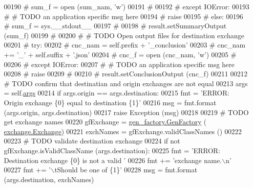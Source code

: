 \begin{DoxyCode}
{00190 \textcolor{comment}{#                sum\_f = open (sum\_nam, 'w')}
00191 \textcolor{comment}{#                }
00192 \textcolor{comment}{#            except IOError:}
00193 \textcolor{comment}{#                # TODO an application specific msg here}
00194 \textcolor{comment}{#                raise}
00195 \textcolor{comment}{#        else:}
00196 \textcolor{comment}{#            sum\_f = sys.\_\_stdout\_\_}
00197 \textcolor{comment}{#            }
00198 \textcolor{comment}{#        result.setSummaryOutput (sum\_f)}
00199 \textcolor{comment}{#            }
00200 \textcolor{comment}{#        # TODO Open output files for destination exchange}
00201 \textcolor{comment}{#        try:}
00202 \textcolor{comment}{#            cnc\_nam  =  self.prefix + '\_conclusion'}
00203 \textcolor{comment}{#            cnc\_nam += '\_' + self.suffix + '.json'}
00204 \textcolor{comment}{#            cnc\_f = open (cnc\_nam, 'w')}
00205 \textcolor{comment}{#            }
00206 \textcolor{comment}{#        except IOError:}
00207 \textcolor{comment}{#            # TODO an application specific msg here}
00208 \textcolor{comment}{#            raise}
00209 \textcolor{comment}{#            }
00210 \textcolor{comment}{#        result.setConclusionOutput (cnc\_f)}
00211             
00212         \textcolor{comment}{# TODO confirm that destinatian and origin exchanges are not equal}
00213         args = self.\hyperlink{classe2e_1_1_application_abade6fc2e2c04ddd7e48137a2a7721bd}{args} 
00214         \textcolor{keywordflow}{if} args.origin == args.destination:
00215             fmt = \textcolor{stringliteral}{'ERROR: Origin exchange \{0\} equal to destination \{1\}'}
00216             msg = fmt.format (args.origin, args.destination)
00217             \textcolor{keywordflow}{raise} Exception (msg)
00218 
00219         \textcolor{comment}{# TODO get exchange names }
00220         gfExchange = \hyperlink{classgen__factory_1_1_gen_factory}{gen\_factory.GenFactory} (
      \hyperlink{classexchange_1_1_exchange}{exchange.Exchange})
00221         exchNames = gfExchange.validClassNames ()
00222         
00223         \textcolor{comment}{# TODO validate destination exchange}
00224         \textcolor{keywordflow}{if} \textcolor{keywordflow}{not} gfExchange.isValidClassName (args.destination):
00225             fmt  = \textcolor{stringliteral}{'ERROR: Destination exchange \{0\} is not a valid '}
00226             fmt += \textcolor{stringliteral}{'exchange name.\(\backslash\)n'}
00227             fmt += \textcolor{stringliteral}{'\(\backslash\)tShould be one of \{1\}'}
00228             msg = fmt.format (args.destination, exchNames)
}
\end{DoxyCode}

